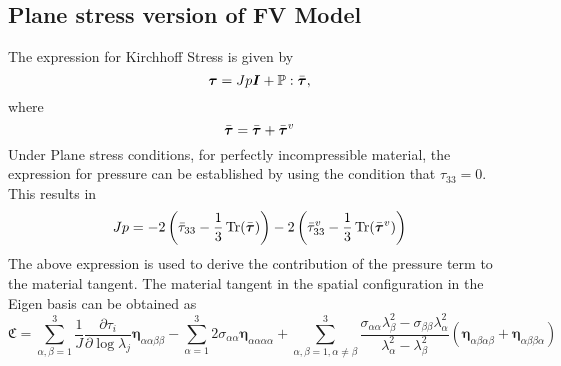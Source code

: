 \documentclass[11pt,a4paper]{article}
\newcommand{\parder}[2]{{\dfrac{\partial #1}{\partial #2}}}
\begin{document}
\subsection{Plane stress version of FV Model}
The expression for Kirchhoff Stress is given by
\begin{equation}
\mbox{\boldmath $\tau$} = Jp\mbox{\boldmath $I$} + \mathbb{P}:\bar{\mbox{\boldmath $\tau$}},
\end{equation}
where
\begin{equation}
\bar{\mbox{\boldmath $\tau$}} = \bar{\mbox{\boldmath $\tau$}} + \bar{\mbox{\boldmath $\tau$}}^v
\end{equation}
Under Plane stress conditions, for perfectly incompressible material, the expression for pressure can be established by using the condition that $\tau_{33}=0$. This results in
\begin{equation}
Jp = -2\left(\bar{\tau}_{33}-\frac{1}{3}\operatorname{Tr}(\bar{\mbox{\boldmath $\tau$}}) \right)-2\left(\bar{\tau}^v_{33}-\frac{1}{3}\operatorname{Tr}(\bar{\mbox{\boldmath $\tau$}}^v) \right)
\end{equation}
The above expression is used to derive the contribution of the pressure term to the material tangent. The material tangent in the spatial configuration in the Eigen basis can be obtained as \cite{Bonet2008}
\begin{equation}
\mathfrak{C}= \sum_{\alpha,\beta =1}^{3} \frac{1}{J}\parder{\tau_i}{\log \lambda_j} \boldsymbol{\eta}_{\alpha\alpha\beta\beta} - \sum_{\alpha=1}^{3} 2 \sigma_{\alpha\alpha}\boldsymbol{\eta}_{\alpha\alpha\alpha\alpha} + \sum_{\alpha,\beta =1, \alpha\neq\beta}^{3} \frac{\sigma_{\alpha\alpha} \lambda_\beta^2-\sigma_{\beta\beta} \lambda_\alpha^2}{\lambda_\alpha^2- \lambda_\beta^2} \left( \boldsymbol{\eta}_{\alpha\beta\alpha\beta} + \boldsymbol{\eta}_{\alpha\beta\beta\alpha} \right)
\end{equation}
\end{document}
